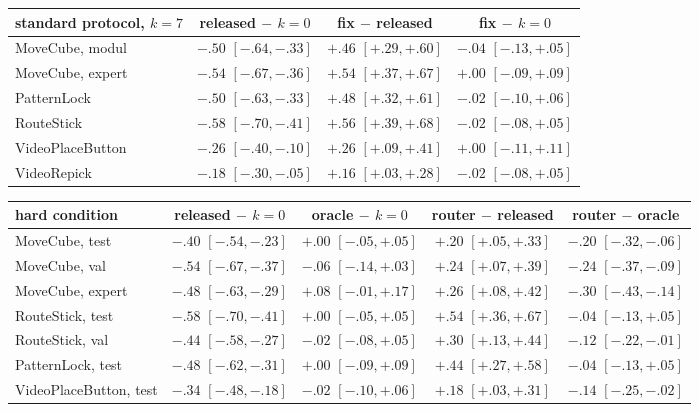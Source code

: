 \begin{tabular}{lccc}
\toprule
standard protocol, $k{=}7$ & released $-$ $k{=}0$ & fix $-$ released & fix $-$ $k{=}0$\\
\midrule
MoveCube, modul & $-.50$ $[-.64,-.33]$ & $+.46$ $[+.29,+.60]$ & $-.04$ $[-.13,+.05]$\\
MoveCube, expert & $-.54$ $[-.67,-.36]$ & $+.54$ $[+.37,+.67]$ & $+.00$ $[-.09,+.09]$\\
PatternLock & $-.50$ $[-.63,-.33]$ & $+.48$ $[+.32,+.61]$ & $-.02$ $[-.10,+.06]$\\
RouteStick & $-.58$ $[-.70,-.41]$ & $+.56$ $[+.39,+.68]$ & $-.02$ $[-.08,+.05]$\\
VideoPlaceButton & $-.26$ $[-.40,-.10]$ & $+.26$ $[+.09,+.41]$ & $+.00$ $[-.11,+.11]$\\
VideoRepick & $-.18$ $[-.30,-.05]$ & $+.16$ $[+.03,+.28]$ & $-.02$ $[-.08,+.05]$\\
\bottomrule
\end{tabular}

\vspace{4pt}
\begin{tabular}{lcccc}
\toprule
hard condition & released $-$ $k{=}0$ & oracle $-$ $k{=}0$ & router $-$ released & router $-$ oracle\\
\midrule
MoveCube, test & $-.40$ $[-.54,-.23]$ & $+.00$ $[-.05,+.05]$ & $+.20$ $[+.05,+.33]$ & $-.20$ $[-.32,-.06]$\\
MoveCube, val & $-.54$ $[-.67,-.37]$ & $-.06$ $[-.14,+.03]$ & $+.24$ $[+.07,+.39]$ & $-.24$ $[-.37,-.09]$\\
MoveCube, expert & $-.48$ $[-.63,-.29]$ & $+.08$ $[-.01,+.17]$ & $+.26$ $[+.08,+.42]$ & $-.30$ $[-.43,-.14]$\\
RouteStick, test & $-.58$ $[-.70,-.41]$ & $+.00$ $[-.05,+.05]$ & $+.54$ $[+.36,+.67]$ & $-.04$ $[-.13,+.05]$\\
RouteStick, val & $-.44$ $[-.58,-.27]$ & $-.02$ $[-.08,+.05]$ & $+.30$ $[+.13,+.44]$ & $-.12$ $[-.22,-.01]$\\
PatternLock, test & $-.48$ $[-.62,-.31]$ & $+.00$ $[-.09,+.09]$ & $+.44$ $[+.27,+.58]$ & $-.04$ $[-.13,+.05]$\\
VideoPlaceButton, test & $-.34$ $[-.48,-.18]$ & $-.02$ $[-.10,+.06]$ & $+.18$ $[+.03,+.31]$ & $-.14$ $[-.25,-.02]$\\
\bottomrule
\end{tabular}
